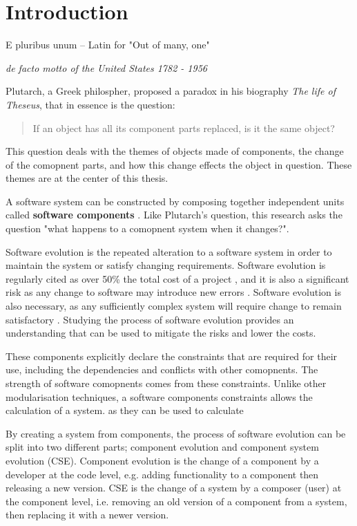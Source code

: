 \chapter{Introduction}
\label{introduction}
\epigraph{E pluribus unum -- Latin for "Out of many, one"}
{\textit{de facto motto of the United States 1782 - 1956}}
Plutarch, a Greek philospher, proposed a paradox in his biography \textit{The life of Theseus}, 
that in essence is the question:
\begin{quote}
If an object has all its component parts replaced, is it the same object?
\end{quote}
This question deals with the themes of objects made of components, the change of the comopnent parts,
and how this change effects the object in question.
These themes are at the center of this thesis.

A software system can be constructed by composing together independent units called \textbf{software components} \citep{Szyperski2002}.
Like Plutarch's question, this research asks the question "what happens to a comopnent system when it changes?".


Software evolution is the repeated alteration to a software system in order to maintain the system or satisfy changing requirements.
Software evolution is regularly cited as over 50\% the total cost of a project \citep{Grubb2003},
and it is also a significant risk as any change to software may introduce new errors \citep{Brooks1975}.
Software evolution is also necessary, as any sufficiently complex system will require change to remain satisfactory \citep{lehman1980}. 
Studying the process of software evolution provides an understanding that can be used to mitigate the risks and lower the costs.


These components explicitly declare the constraints that are required for their use,
including the dependencies and conflicts with other comopnents.
The strength of software comopnents comes from these constraints.
Unlike other modularisation techniques, a software components constraints allows the calculation of a system.
as they can be used to calculate 



By creating a system from components, the process of software evolution can be split into two different parts;
component evolution and component system evolution (CSE).
Component evolution is the change of a component by a developer at the code level,
e.g. adding functionality to a component then releasing a new version.  
CSE is the change of a system by a composer (user) at the component level,
i.e. removing an old version of a component from a system, then replacing it with a newer version.


